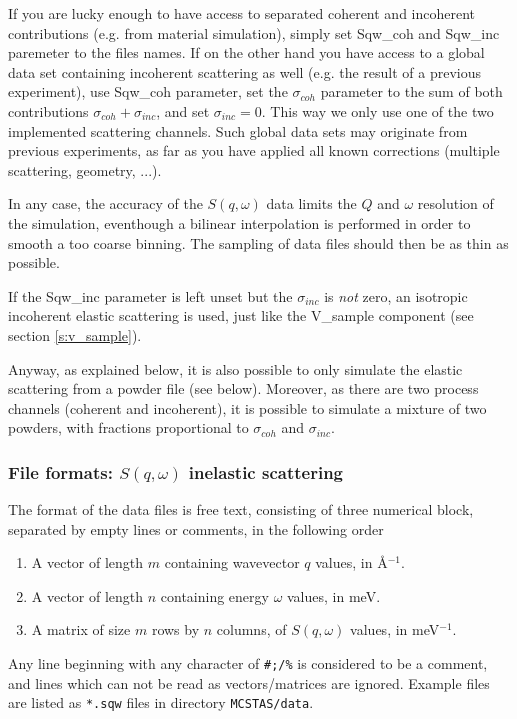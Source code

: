 If you are lucky enough to have access to separated coherent and incoherent contributions (e.g. from material simulation), simply set Sqw\_coh and Sqw\_inc paremeter to the files names. If on the other hand you have access to a global data set containing incoherent scattering as well (e.g. the result of a previous experiment), use Sqw\_coh parameter, set the $\sigma_{coh}$ parameter to the sum of both contributions $\sigma_{coh}+\sigma_{inc}$, and set $\sigma_{inc}=0$. This way we only use one of the two implemented  scattering channels. Such global data sets may originate from previous experiments, as far as you have applied all known corrections (multiple scattering, geometry, ...).

In any case, the accuracy of the $S(q, \omega)$ data limits the $Q$ and $\omega$ resolution of the simulation, eventhough a bilinear interpolation is performed in order to smooth a too coarse binning. The sampling of data files should then be as thin as possible.

If the Sqw\_inc parameter is left unset but the $\sigma_{inc}$ is \emph{not} zero, an isotropic incoherent elastic scattering is used, just like the V\_sample component (see section \ref{s:v_sample}).

Anyway, as explained below, it is also possible to only simulate the elastic scattering from a powder file (see below). Moreover, as there are two process channels (coherent and incoherent), it is possible to simulate a mixture of two powders, with fractions proportional to $\sigma_{coh}$ and $\sigma_{inc}$.

\subsubsection{File formats: $S(q,\omega)$ inelastic scattering}

The format of the data files is free text, consisting of three numerical block, separated by empty lines or comments, in the following order
\begin{enumerate}
\item A vector of length $m$ containing wavevector $q$ values, in \AA$^{-1}$.
\item A vector of length $n$ containing energy $\omega$ values, in meV.
\item A matrix of size $m$ rows by $n$ columns, of $S(q, \omega)$ values, in meV$^{-1}$.
\end{enumerate}
Any line beginning with any character of \verb+#;/%+ is considered to be a comment, and lines which can not be read as vectors/matrices are ignored.
Example files are listed as \verb+*.sqw+ files in directory \verb+MCSTAS/data+.

